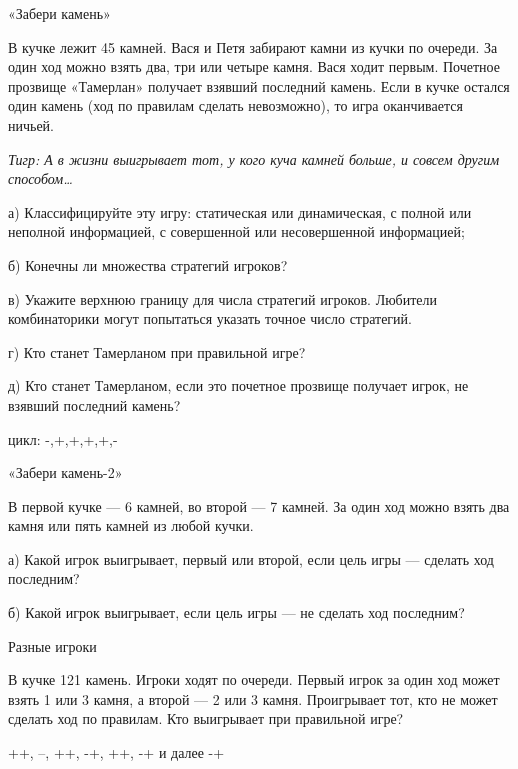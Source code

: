 \begin{problem}
 «Забери камень»\par
В кучке лежит 45 камней. Вася и Петя забирают камни из кучки по очереди. За один ход можно взять два, три или четыре камня. Вася ходит первым. Почетное прозвище «Тамерлан» получает взявший последний камень. Если в кучке остался один камень (ход по правилам сделать невозможно), то игра оканчивается ничьей.\par
{\it Тигр: А в жизни выигрывает тот, у кого куча камней больше, и совсем другим способом\ldots }\par
а)	Классифицируйте эту игру: статическая или динамическая, с полной или неполной информацией, с совершенной или несовершенной информацией;\par
б)	Конечны ли множества стратегий игроков?\par
в)	Укажите верхнюю границу для числа стратегий игроков. Любители комбинаторики могут попытаться указать точное число стратегий.\par
г)	Кто станет Тамерланом при правильной игре?\par
д)	Кто станет Тамерланом, если это почетное прозвище получает игрок, не взявший последний камень?



\begin{sol}
 цикл: -,+,+,+,+,-
\end{sol}
\end{problem}



\begin{problem}
 «Забери камень-2»\par
В первой кучке — 6 камней, во второй — 7 камней. За один ход можно взять два камня или пять камней из любой кучки.\par
а)	Какой игрок выигрывает, первый или второй, если цель игры — сделать ход последним?\par
б)	Какой игрок выигрывает, если цель игры — не сделать ход последним?



\begin{sol}

\end{sol}
\end{problem}




\begin{problem}
 Разные игроки\par
В кучке 121 камень. Игроки ходят по очереди. Первый игрок за один ход может взять 1 или 3 камня, а второй — 2 или 3 камня. Проигрывает тот, кто не может сделать ход по правилам. Кто выигрывает при правильной игре?



\begin{sol}
 ++, --, ++, -+, ++, -+ и далее -+
\end{sol}
\end{problem}



